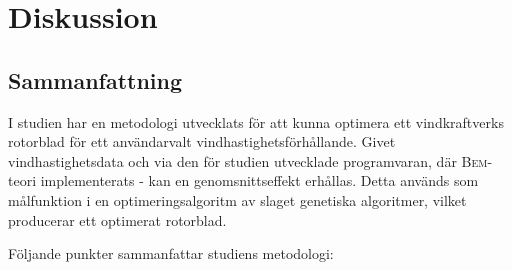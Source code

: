 \chapter{Diskussion} \label{Chapter:diskussion}

\section{Sammanfattning}

I studien har en metodologi utvecklats för att kunna optimera ett vindkraftverks rotorblad för ett användarvalt vindhastighetsförhållande. Givet vindhastighetsdata och via den för studien utvecklade programvaran, där \textsc{Bem}-teori implementerats - kan en genomsnittseffekt erhållas. Detta används som målfunktion i en optimeringsalgoritm av slaget genetiska algoritmer, vilket producerar ett optimerat rotorblad. 

Följande punkter sammanfattar studiens metodologi:


